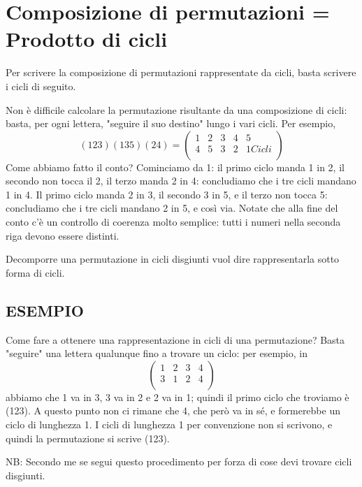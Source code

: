 \section{Composizione di permutazioni = Prodotto di cicli}
Per scrivere la composizione di permutazioni rappresentate da cicli,
basta scrivere i cicli di seguito.

Non è difficile calcolare la permutazione risultante da una composizione di cicli: basta, per ogni lettera, "seguire il suo destino" lungo
i vari cicli. Per esempio,
\[
 (123)(135)(24) = \left(\begin{array}{ccccc}
                         1 & 2 & 3 & 4 & 5 \\
                         4 & 5 & 3 & 2 & 1 Cicli\\
                        \end{array} \right)
\]
Come abbiamo fatto il conto? Cominciamo da 1: il primo ciclo manda 1 in 2, il secondo non tocca il 2, il terzo manda 2 in 4: concludiamo
che i tre cicli mandano 1 in 4. Il primo ciclo manda 2 in 3, il secondo 3 in 5, e il terzo non tocca 5: concludiamo che i tre cicli
mandano 2 in 5, e così via. Notate che alla fine del conto c'è un controllo di coerenza molto semplice:  tutti i numeri
nella seconda riga devono essere distinti.

\begin{definizione}
Decomporre una permutazione in cicli disgiunti vuol dire rappresentarla sotto forma di cicli.
\end{definizione}

\subsection{ESEMPIO}
Come fare a ottenere una rappresentazione in cicli di una permutazione? Basta "seguire" una lettera qualunque fino a trovare
un ciclo: per esempio, in 
\[
\left( \begin{array}{cccc} 1 & 2 & 3 & 4 \\ 3 & 1 & 2 & 4 \\ \end{array} \right) 
\]
abbiamo che 1 va in 3, 3 va in 2 e 2 va in 1; quindi il primo ciclo che troviamo è (123). A questo punto non ci rimane che 4,
che però va in sé, e formerebbe un ciclo di lunghezza 1. I cicli di lunghezza 1 per convenzione non si scrivono, e
quindi la permutazione si scrive (123).

NB: Secondo me se segui questo procedimento per forza di cose devi trovare cicli disgiunti.

